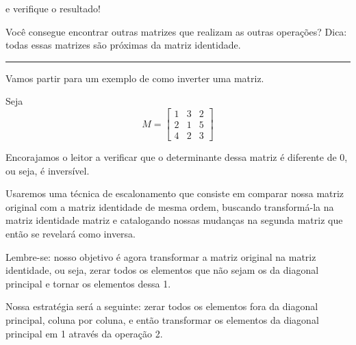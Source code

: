 \documentclass[
  letterpaper,
  DIV=11,
  numbers=noendperiod]{scrreprt}
\begin{document}
e verifique o resultado!

Você consegue encontrar outras matrizes que realizam as outras
operações? Dica: todas essas matrizes são próximas da matriz identidade.

\begin{center}\rule{0.5\linewidth}{0.5pt}\end{center}

Vamos partir para um exemplo de como inverter uma matriz.

Seja \[
M = 
\begin{bmatrix}
    1 & 3 & 2 \\
    2 & 1 & 5 \\
    4 & 2 & 3
\end{bmatrix}
\]

Encorajamos o leitor a verificar que o determinante dessa matriz é
diferente de 0, ou seja, é inversível.

Usaremos uma técnica de escalonamento que consiste em comparar nossa
matriz original com a matriz identidade de mesma ordem, buscando
transformá-la na matriz identidade matriz e catalogando nossas mudanças
na segunda matriz que então se revelará como inversa.

Lembre-se: nosso objetivo é agora transformar a matriz original na
matriz identidade, ou seja, zerar todos os elementos que não sejam os da
diagonal principal e tornar os elementos dessa 1.

Nossa estratégia será a seguinte: zerar todos os elementos fora da
diagonal principal, coluna por coluna, e então transformar os elementos
da diagonal principal em 1 através da operação 2.
\end{document}
